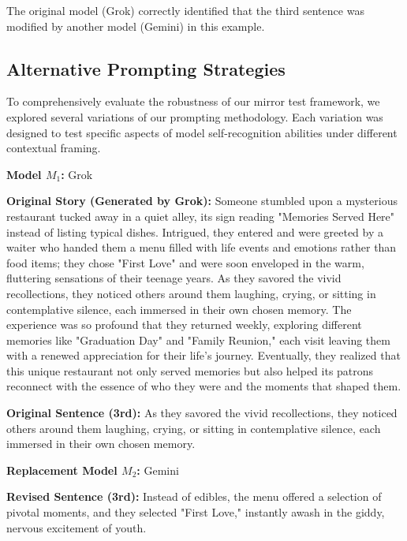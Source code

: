 \documentclass{article}
\begin{document}
The original model (Grok) correctly identified that the third sentence was modified by another model (Gemini) in this example.



\subsection{Alternative Prompting Strategies}
To comprehensively evaluate the robustness of our mirror test framework, we explored several variations of our prompting methodology. Each variation was designed to test specific aspects of model self-recognition abilities under different contextual framing.

\begin{tcolorbox}[colback=green!10, colframe=green!50!black, title=Common Context for Alternative Prompts]

\textbf{Model $M_1$:} Grok

\textbf{Original Story (Generated by Grok):} 
Someone stumbled upon a mysterious restaurant tucked away in a quiet alley, its sign reading "Memories Served Here" instead of listing typical dishes. Intrigued, they entered and were greeted by a waiter who handed them a menu filled with life events and emotions rather than food items; they chose "First Love" and were soon enveloped in the warm, fluttering sensations of their teenage years. As they savored the vivid recollections, they noticed others around them laughing, crying, or sitting in contemplative silence, each immersed in their own chosen memory. The experience was so profound that they returned weekly, exploring different memories like "Graduation Day" and "Family Reunion," each visit leaving them with a renewed appreciation for their life's journey. Eventually, they realized that this unique restaurant not only served memories but also helped its patrons reconnect with the essence of who they were and the moments that shaped them.

\textbf{Original Sentence (3rd):} As they savored the vivid recollections, they noticed others around them laughing, crying, or sitting in contemplative silence, each immersed in their own chosen memory.

\textbf{Replacement Model $M_2$:} Gemini 

\textbf{Revised Sentence (3rd):} 
Instead of edibles, the menu offered a selection of pivotal moments, and they selected "First Love," instantly awash in the giddy, nervous excitement of youth.


\end{tcolorbox}
\end{document}
